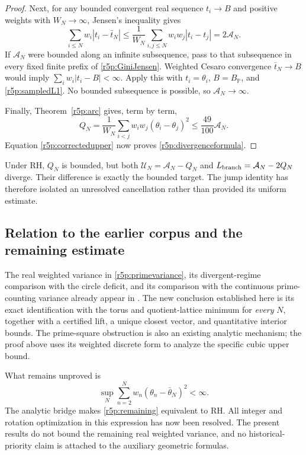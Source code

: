 \documentclass[11pt,a4paper]{article}
\theoremstyle{definition}\newtheorem{definition}[theorem]{Definition}
\theoremstyle{remark}\newtheorem{remark}[theorem]{Remark}
\numberwithin{equation}{section}
\begin{document}
\begin{proof}
Next, for any bounded convergent real sequence $t_i\to B$ and
positive weights with $W_N\to\infty$, Jensen's inequality gives
\begin{equation}\label{r5p:GiniJensen}
 \sum_{i\leq N}w_i|t_i-\bar t_N|
 \leq\frac1{W_N}\sum_{i,j\leq N}w_iw_j|t_i-t_j|
 =2\mathcal A_N.
\end{equation}
If $\mathcal A_N$ were bounded along an infinite subsequence,
pass to that subsequence in every fixed finite prefix of
\eqref{r5p:GiniJensen}.  Weighted Cesaro convergence
$\bar t_N\to B$ would imply $\sum_iw_i|t_i-B|<\infty$.
Apply this with $t_i=\theta_i$, $B=B_{\mathbb P}$, and
\eqref{r5p:sampledL1}.  No bounded subsequence is possible, so
$\mathcal A_N\to\infty$.

Finally, Theorem~\ref{r5p:arc} gives, term by term,
\[
 Q_N=\frac1{W_N}\sum_{i<j}w_iw_j(\theta_i-\theta_j)^2
       \leq\frac{49}{100}\mathcal A_N.
\]
Equation \eqref{r5p:correctedupper} now proves
\eqref{r5p:divergenceformula}.
\end{proof}

Under RH, $Q_N$ is bounded, but both
$\mathcal U_N=\mathcal A_N-Q_N$ and
$L_{\rm branch}=\mathcal A_N-2Q_N$ diverge.
Their difference is exactly the bounded target.  The jump identity
has therefore isolated an unresolved cancellation rather than
provided its uniform estimate.

\subsection{Relation to the earlier corpus and the remaining estimate}

The real weighted variance in \eqref{r5p:primevariance}, its
divergent-regime comparison with the circle deficit, and its
comparison with the continuous prime-counting variance already
appear in \cite{PrimeCircles}.  The new conclusion established here
is its exact identification with the torus and quotient-lattice
minimum for \emph{every} $N$, together with a certified lift, a
unique closest vector, and quantitative interior bounds.
The prime-square obstruction is also an existing analytic mechanism;
the proof above uses its weighted discrete form to analyze the
specific cubic upper bound.

What remains unproved is
\begin{equation}\label{r5p:remaining}
 \sup_N\sum_{n=2}^Nw_n(\theta_n-\bar\theta_N)^2<\infty.
\end{equation}
The analytic bridge makes \eqref{r5p:remaining} equivalent to RH.
All integer and rotation optimization in this expression has now
been resolved.  The present results do not bound the remaining real
weighted variance, and no historical-priority claim is attached to
the auxiliary geometric formulas.
\end{document}

